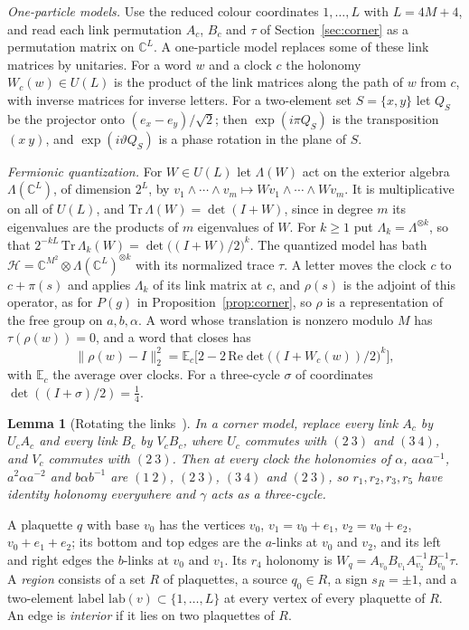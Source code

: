 \documentclass[11pt,a4paper]{article}
\theoremstyle{plain}
\newtheorem{lemma}[theorem]{Lemma}
\theoremstyle{definition}
\theoremstyle{remark}
\begin{document}
\emph{One-particle models.} Use the reduced colour coordinates $1,\dots,L$ with $L=4M+4$, and read each link permutation $A_c$, $B_c$
and $\tau$ of Section~\ref{sec:corner} as a permutation matrix on $\mathbb C^L$. A one-particle model replaces some of these link matrices
by unitaries. For a word $w$ and a clock $c$ the holonomy $W_c(w)\in U(L)$ is the product of the link matrices along the path of $w$ from
$c$, with inverse matrices for inverse letters. For a two-element set $S=\{x,y\}$ let $Q_S$ be the projector onto
$(e_x-e_y)/\sqrt2$; then $\exp(i\pi Q_S)$ is the transposition $(x\ y)$, and $\exp(i\vartheta Q_S)$ is a phase rotation in the plane of $S$.

\emph{Fermionic quantization.} For $W\in U(L)$ let $\Lambda(W)$ act on the exterior algebra $\Lambda(\mathbb C^L)$, of dimension $2^L$,
by $v_1\wedge\cdots\wedge v_m\mapsto Wv_1\wedge\cdots\wedge Wv_m$. It is multiplicative on all of $U(L)$, and
$\mathrm{Tr}\,\Lambda(W)=\det(I+W)$, since in degree $m$ its eigenvalues are the products of $m$ eigenvalues of $W$. For $k\ge1$ put
$\Lambda_k=\Lambda^{\otimes k}$, so that $2^{-kL}\,\mathrm{Tr}\,\Lambda_k(W)=\det\big((I+W)/2\big)^k$. The quantized model has bath
$\mathcal H=\mathbb C^{M^2}\otimes\Lambda(\mathbb C^L)^{\otimes k}$ with its normalized trace $\tau$. A letter moves the clock $c$ to
$c+\pi(s)$ and applies $\Lambda_k$ of its link matrix at $c$, and $\rho(s)$ is the adjoint of this operator, as for $P(g)$ in
Proposition~\ref{prop:corner}, so $\rho$ is a representation of the free group on $a,b,\alpha$. A word whose translation is nonzero
modulo $M$ has $\tau(\rho(w))=0$, and a word that closes has
\[
\|\rho(w)-I\|_2^2=\mathbb E_c\Big[2-2\,\mathrm{Re}\det\big((I+W_c(w))/2\big)^k\Big],
\]
with $\mathbb E_c$ the average over clocks. For a three-cycle $\sigma$ of coordinates $\det((I+\sigma)/2)=\frac14$.

\begin{lemma}[Rotating the links~{\cite[Lemma~6.3]{DouglasMghirbiA}}]\label{lem:rotations}
In a corner model, replace every link $A_c$ by $U_cA_c$ and every link $B_c$ by $V_cB_c$, where $U_c$ commutes with $(2\ 3)$ and
$(3\ 4)$, and $V_c$ commutes with $(2\ 3)$. Then at every clock the holonomies of $\alpha$, $a\alpha a^{-1}$, $a^2\alpha a^{-2}$ and
$b\alpha b^{-1}$ are $(1\ 2)$, $(2\ 3)$, $(3\ 4)$ and $(2\ 3)$, so $r_1,r_2,r_3,r_5$ have identity holonomy everywhere and $\gamma$ acts
as a three-cycle.
\end{lemma}


A plaquette $q$ with base $v_0$ has the vertices $v_0$, $v_1=v_0+e_1$, $v_2=v_0+e_2$, $v_0+e_1+e_2$; its bottom and top edges are the
$a$-links at $v_0$ and $v_2$, and its left and right edges the $b$-links at $v_0$ and $v_1$. Its $r_4$ holonomy is
$W_q=A_{v_0}B_{v_1}A_{v_2}^{-1}B_{v_0}^{-1}\tau$. A \emph{region} consists of a set $R$ of plaquettes, a source $q_0\in R$, a sign
$s_R=\pm1$, and a two-element label $\mathrm{lab}(v)\subset\{1,\dots,L\}$ at every vertex of every plaquette of $R$. An edge is
\emph{interior} if it lies on two plaquettes of $R$.
\end{document}
